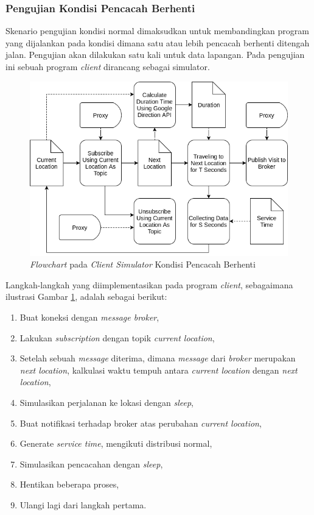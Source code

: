 \subsubsection{Pengujian Kondisi Pencacah Berhenti}
Skenario pengujian kondisi normal dimaksudkan untuk membandingkan program yang dijalankan pada kondisi dimana satu atau lebih pencacah berhenti ditengah jalan. Pengujian akan dilakukan satu kali untuk data lapangan. Pada pengujian ini sebuah program \textit{client} dirancang sebagai simulator.


\begin{figure}[h]
    \centering
    \includegraphics[width=\textwidth]{../../Resources/Images/client-algorithm-enumerator-quit-field}
    \caption{\textit{Flowchart} pada \textit{Client Simulator} Kondisi Pencacah Berhenti}
    \label{fig:client-algorithm-enumerator-quit-field}
\end{figure}


Langkah-langkah yang diimplementasikan pada program \textit{client}, sebagaimana ilustrasi Gambar \ref{fig:client-algorithm-enumerator-quit-field}, adalah sebagai berikut:

\begin{enumerate}
\item Buat koneksi dengan \textit{message broker}, 
\item Lakukan \textit{subscription} dengan topik \textit{current location}, 
\item Setelah sebuah \textit{message} diterima, dimana \textit{message} dari \textit{broker} merupakan \textit{next location}, kalkulasi waktu tempuh antara \textit{current location} dengan \textit{next location},
\item Simulasikan perjalanan ke lokasi dengan \textit{sleep},
\item Buat notifikasi terhadap broker atas perubahan \textit{current location}, 
\item Generate \textit{service time}, mengikuti distribusi normal, 
\item Simulasikan pencacahan dengan \textit{sleep}, 
\item Hentikan beberapa proses, 
\item Ulangi lagi dari langkah pertama.
\end{enumerate}


